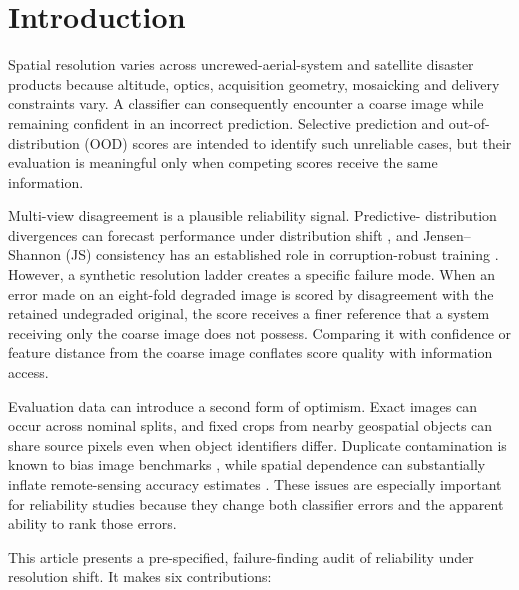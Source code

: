 \section{Introduction}

Spatial resolution varies across uncrewed-aerial-system and satellite disaster
products because altitude, optics, acquisition geometry, mosaicking and
delivery constraints vary. A classifier can consequently encounter a coarse
image while remaining confident in an incorrect prediction. Selective
prediction and out-of-distribution (OOD) scores are intended to identify such
unreliable cases, but their evaluation is meaningful only when competing scores
receive the same information.

Multi-view disagreement is a plausible reliability signal. Predictive-
distribution divergences can forecast performance under distribution shift
\citep{schirmer2023divergence}, and Jensen--Shannon (JS) consistency has an
established role in corruption-robust training \citep{hendrycks2020augmix}.
However, a synthetic resolution ladder creates a specific failure mode. When
an error made on an eight-fold degraded image is scored by disagreement with
the retained undegraded original, the score receives a finer reference that a
system receiving only the coarse image does not possess. Comparing it with
confidence or feature distance from the coarse image conflates score quality
with information access.

Evaluation data can introduce a second form of optimism. Exact images can occur
across nominal splits, and fixed crops from nearby geospatial objects can share
source pixels even when object identifiers differ. Duplicate contamination is
known to bias image benchmarks \citep{barz2020cifair}, while spatial dependence
can substantially inflate remote-sensing accuracy estimates
\citep{karasiak2022spatial,kattenborn2022spatial}. These issues are especially
important for reliability studies because they change both classifier errors
and the apparent ability to rank those errors.

This article presents a pre-specified, failure-finding audit of reliability
under resolution shift. It makes six contributions:

